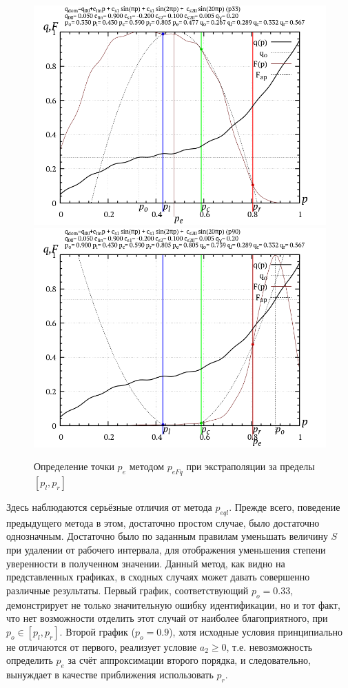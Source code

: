 \begin{figure}[htb!]
  \centerline{
    \includegraphics[width=49\TW]{p/p_eFq/q_p_eFq_p33.png}
    \hfill
    \includegraphics[width=49\TW]{p/p_eFq/q_p_eFq_p90.png}
  }
  \caption{Определение точки $p_e$ методом $p_{eFq}$ при экстраполяции за пределы $[p_l,p_r]$ }
  \label{atu:f:p_eFq_extra}
\end{figure}

Здесь наблюдаются серьёзные отличия от метода $p_{eql}$.
Прежде всего, поведение предыдущего метода
в этом, достаточно простом случае, было достаточно однозначным.
Достаточно было по заданным правилам уменьшать величину $S$
при удалении от рабочего интервала, для отображения
уменьшения степени уверенности в полученном значении.
Данный метод, как видно на представленных графиках,
в сходных случаях может давать совершенно различные результаты.
Первый график, соответствующий $p_o=0.33$,
демонстрирует не только значительную ошибку идентификации,
но и тот факт, что нет возможности отделить этот случай от
наиболее благоприятного, при $p_o \in [p_l,p_r]$.
Второй график ($p_o=0.9$), хотя исходные условия принципиально не отличаются
от первого, реализует условие $a_2 \ge 0 $, т.е. невозможность
определить $p_e$ за счёт аппроксимации второго порядка, и следовательно,
вынуждает в качестве приближения использовать $p_r$.

